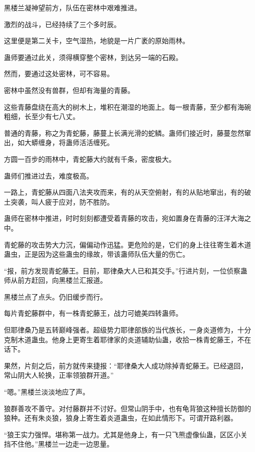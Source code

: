 
\begin{this_body}



黑楼兰凝神望前方，队伍在密林中艰难推进。

激烈的战斗，已经持续了三个多时辰。

这里便是第二关卡，空气湿热，地貌是一片广袤的原始雨林。

蛊师要通过此关，须得横穿整个密林，到达另一端的石殿。

然而，要通过这处密林，可不容易。

密林中虽然没有兽群，但却有海量的青藤。

这些青藤盘绕在高大的树木上，堆积在潮湿的地面上。每一根青藤，至少都有海碗粗细，长至少有七八丈。

普通的青藤，称之为青蛇藤，藤蔓上长满光滑的蛇鳞。蛊师们接近时，藤蔓忽然窜出，如大蟒缠身，将蛊师活活缠死。

方圆一百步的雨林中，青蛇藤大约就有千条，密度极大。

蛊师们推进过去，难度极高。

一路上，青蛇藤从四面八法夹攻而来，有的从天空俯射，有的从贴地窜出，有的破土突袭，叫人疲于应对，防不胜防。

蛊师在密林中推进，时时刻刻都遭受着青藤的攻击，宛如置身在青藤的汪洋大海之中。

青蛇藤的攻击势大力沉，偏偏动作迅猛。更危险的是，它们的身上往往寄生着木道蛊虫，正是因为这些蛊虫的缘故，带该蛊师队伍大量的伤亡。

“报，前方发现青蛇藤王。目前，耶律桑大人已和其交手。”行进片刻，一位侦察蛊师从前方赶回，向黑楼兰汇报道。

黑楼兰点了点头。仍旧缓步而行。

每片青蛇藤群中，有一株青蛇藤王，战力可媲美四转蛊师。

但耶律桑乃是五转巅峰强者。超级势力耶律部族的当代族长，一身炎道修为，十分克制木道蛊虫。他身上更寄生着耶律家的炎道辅助仙蛊，收拾一株青蛇藤王，不在话下。

果然，片刻之后，前方就传来捷报：“耶律桑大人成功除掉青蛇藤王。已经退回，常山阴大人轮换，正率领狼群开道。”

“嗯。”黑楼兰淡淡地应了声。

狼群善攻不善守。对付藤群并不讨好。但常山阴手中，也有龟背狼这种擅长防御的狼种。还有朱炎狼，狼身上寄生着炎道蛊虫，在如此情形下。可谓开路利器。

“狼王实力强悍。堪称第一战力。尤其是他身上，有一只飞熊虚像仙蛊，区区小关挡不住他。”黑楼兰一边走一边思量。


\end{this_body}
